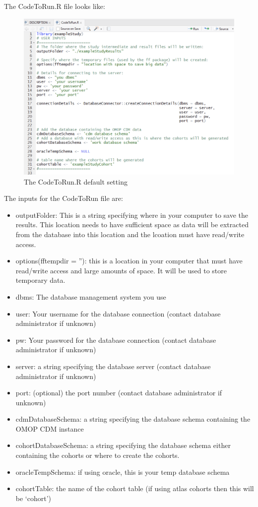 \documentclass[11pt]{book}
\providecommand{\tightlist}{%
  \setlength{\itemsep}{0pt}\setlength{\parskip}{0pt}}
\theoremstyle{definition}
\theoremstyle{definition}
\theoremstyle{definition}
\theoremstyle{remark}
\begin{document}
The CodeToRun.R file looks like:

\begin{figure}
\includegraphics[width=1\linewidth]{images/PatientLevelPrediction/atlasImplementation/code_to_run_open} \caption{The CodeToRun.R default setting}\label{fig:figureU19}
\end{figure}

The inputs for the CodeToRun file are:

\begin{itemize}
\tightlist
\item
  outputFolder: This is a string specifying where in your computer to save the results. This location needs to have sufficient space as data will be extracted from the database into this location and the lcoation must have read/write access.
\item
  options(fftempdir = ''): this is a location in your computer that must have read/write access and large amounts of space. It will be used to store temporary data.
\item
  dbms: The database management system you use
\item
  user: Your username for the database connection (contact database administrator if unknown)
\item
  pw: Your password for the database connection (contact database administrator if unknown)
\item
  server: a string specifying the database server (contact database administrator if unknown)
\item
  port: (optional) the port number (contact database administrator if unknown)
\item
  cdmDatabaseSchema: a string specifying the database schema containing the OMOP CDM instance
\item
  cohortDatabaseSchema: a string specifying the database schema either containing the cohorts or where to create the cohorts.
\item
  oracleTempSchema: if using oracle, this is your temp database schema
\item
  cohortTable: the name of the cohort table (if using atlas cohorts then this will be `cohort')
\end{itemize}
\end{document}
